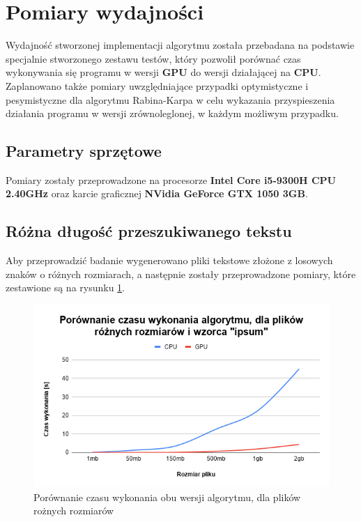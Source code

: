 \section{Pomiary wydajności}
Wydajność stworzonej implementacji algorytmu została przebadana na podstawie specjalnie stworzonego zestawu testów, który pozwolił porównać czas wykonywania się programu w wersji \textbf{GPU} do wersji działającej na \textbf{CPU}. Zaplanowano także pomiary uwzględniające przypadki optymistyczne i pesymistyczne dla algorytmu Rabina-Karpa w celu wykazania przyspieszenia działania programu w wersji zrównoleglonej, w każdym możliwym przypadku. 

\subsection{Parametry sprzętowe}
Pomiary zostały przeprowadzone na procesorze \textbf{Intel Core i5-9300H CPU 2.40GHz} oraz karcie graficznej \textbf{NVidia GeForce GTX 1050 3GB}.

\subsection{Różna długość przeszukiwanego tekstu}
Aby przeprowadzić badanie wygenerowano pliki tekstowe złożone z losowych znaków o różnych rozmiarach, a następnie zostały przeprowadzone pomiary, które zestawione są na rysunku \ref{fig:chart_1}.

\begin{figure}[H]
    \centering
    \includegraphics[width=\linewidth]{images/wykres41.png}
    \caption{Porównanie czasu wykonania obu wersji algorytmu, dla plików rożnych rozmiarów}
    \label{fig:chart_1}
\end{figure}


